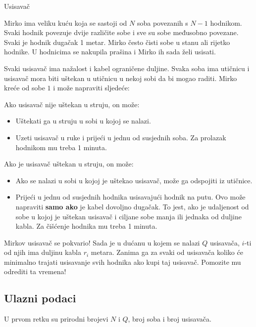 \begin{statement}[
  problempoints=100,
  timelimit=1 sekunda,
  memorylimit=512 MiB,
]{Usisavač}

Mirko ima veliku kuću koja se sastoji od $N$ soba povezanih s $N - 1$ hodnikom. Svaki hodnik povezuje dvije različite sobe i sve su sobe međusobno povezane. Svaki je hodnik dugačak 1 metar. Mirko često čisti sobe u stanu ali rijetko hodnike. U hodnicima se nakupila prašina i Mirko ih sada želi usisati. 

Svaki usisavač ima nažalost i kabel ograničene duljine. Svaka soba ima utičnicu i usisavač mora biti uštekan u utičnicu u nekoj sobi da bi mogao raditi. Mirko kreće od sobe $1$ i može napraviti sljedeće:

Ako usisavač nije uštekan u struju, on može:
\begin{itemize}
	\item Uštekati ga u struju u sobi u kojoj se nalazi. 
	\item Uzeti usisavač u ruke i prijeći u jednu od susjednih soba. Za prolazak hodnikom mu treba 1 minuta.
\end{itemize}

Ako je usisavač uštekan u struju, on može:
\begin{itemize}
	\item Ako se nalazi u sobi u kojoj je uštekao usisavač, može ga odspojiti iz utičnice.
	\item Prijeći u jednu od susjednih hodnika usisavajući hodnik na putu. Ovo može napraviti \textbf{samo ako} je kabel dovoljno dugačak. To jest, ako je udaljenost od sobe u kojoj je uštekan usisavač i ciljane sobe manja ili jednaka od duljine kabla. Za čišćenje hodnika mu treba 1 minuta.
\end{itemize}

Mirkov usisavač se pokvario! Sada je u dućanu u kojem se nalazi $Q$ usisavača, $i$-ti od njih ima duljinu kabla $r_i$ metara. Zanima ga za svaki od usisavača koliko će minimalno trajati usisavanje svih hodnika ako kupi taj usisavač. Pomozite mu odrediti ta vremena!

\subsection*{Ulazni podaci}

U prvom retku su prirodni brojevi $N$ i $Q$, broj soba i broj usisavača.


\end{statement}
